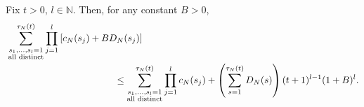 \begin{lemma}\label{thm:sumprod2}
Fix $t>0$, $l\in\mathbb{N}$.
Then, for any constant $B>0$,
\begin{align*}
&\sum_{\substack{ s_1, \dots, s_l =1 \\ \text{\normalfont{all distinct}} }}^{\tau_N(t)} 
        \prod_{j=1}^l \left[ c_N(s_j) + B D_N(s_j) \right] \\
&\hspace{4cm}\leq \sum_{\substack{ s_1, \dots, s_l =1 \\ \text{\normalfont{all distinct}} }}^{\tau_N(t)} 
        \prod_{j=1}^l c_N(s_j)
        + \left( \sum_{s=1}^{\tau_N(t)} D_N(s) \right) (t+1)^{l-1} (1+B)^l .
\end{align*}
\end{lemma}

